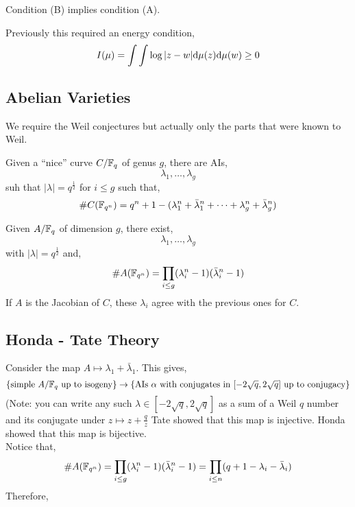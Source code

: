 \documentclass[12pt]{article}
\begin{document}
\begin{thm}[Smith (2021)]
Condition (B) implies condition (A).
\end{thm}

\begin{rmk}
Previously this required an energy condition,
\[ I(\mu) = \int \int \log{|z - w|} \mathrm{d}{\mu(z)} \mathrm{d}{\mu(w)} \ge 0 \]
\end{rmk}

\subsection{Abelian Varieties}

We require the Weil conjectures but actually only the parts that were known to Weil.

\begin{theorem}[Weil]
Given a ``nice'' curve $C / \mathbb{F}_q$ of genus $g$, there are AIs,
\[ \lambda_1, \dots, \lambda_g \]
suh that $|\lambda| = q^{\frac{1}{2}}$ for $i \le g$ such that,
\[ \# C(\mathbb{F}_{q^n}) = q^n + 1 - (\lambda_1^n + \bar{\lambda}_1^n + \cdots + \lambda_g^n + \bar{\lambda}_g^n) \]
\end{theorem}

\begin{thm}[Weil]
Given $A / \mathbb{F}_q$ of dimension $g$, there exist,
\[ \lambda_1, \dots, \lambda_g \]
with $|\lambda| = q^{\frac{1}{2}}$ and,
\[ \# A(\mathbb{F}_{q^n}) = \prod_{i \le g} (\lambda_i^n - 1)(\bar{\lambda}^n_i - 1) \]
If $A$ is the Jacobian of $C$, these $\lambda_i$ agree with the previous ones for $C$.
\end{thm}

\subsection{Honda - Tate Theory}

Consider the map $A \mapsto \lambda_1 + \bar{\lambda}_1$. This gives,
\[ \{ \text{simple } A / \mathbb{F}_q \text{ up to isogeny} \} \to \{ \text{AIs } \alpha \text{ with conjugates in } [-2\sqrt{q}, 2\sqrt{q}] \text{ up to conjugacy} \} \]
(Note: you can write any such $\lambda \in [-2\sqrt{q}, 2\sqrt{q}]$ as a sum of a Weil $q$ number and its conjugate under $z \mapsto z + \frac{q}{z}$
Tate showed that this map is injective. Honda showed that this map is bijective.
\bigskip\\
Notice that,
\[ \# A(\mathbb{F}_{q^n}) = \prod_{i \le g} (\lambda_i^n - 1)(\bar{\lambda}^n_i - 1)  = \prod_{i \le n} (q + 1 - \lambda_i - \bar{\lambda}_i) \]
Therefore, 
\end{document}
